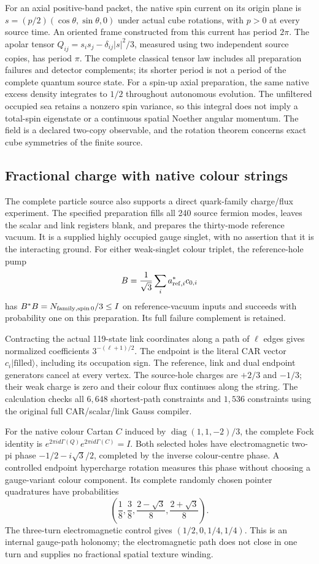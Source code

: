 For an axial positive-band packet, the native spin current on its origin
plane is $s=(p/2)(\cos\theta,\sin\theta,0)$ under actual cube rotations,
with $p>0$ at every source time. An oriented frame constructed from this
current has period $2\pi$. The apolar tensor
$Q_{ij}=s_i s_j-\delta_{ij}|s|^2/3$, measured using two independent source
copies, has period $\pi$. The complete classical tensor law includes all
preparation failures and detector complements; its shorter period is not a
period of the complete quantum source state. For a spin-up axial preparation,
the same native excess density integrates to $1/2$ throughout autonomous
evolution. The unfiltered occupied sea retains a nonzero spin variance,
so this integral does not imply a total-spin eigenstate or a continuous
spatial Noether angular momentum. The field is a declared two-copy observable,
and the rotation theorem concerns exact cube symmetries of the finite source.

\subsection{Fractional charge with native colour strings}

The complete particle source also supports a direct quark-family
charge/flux experiment. The specified preparation fills all 240 source
fermion modes, leaves the scalar and link registers blank, and prepares
the thirty-mode reference vacuum. It is a supplied highly occupied
gauge singlet, with no assertion that it is the interacting ground.
For either weak-singlet colour triplet, the reference-hole pump
\[
 B=\frac1{\sqrt3}\sum_i a_{{\rm ref},i}^*c_{0,i}
\]
has $B^*B=N_{\rm family,spin\,0}/3\leq I$ on reference-vacuum
inputs and succeeds with probability one on this preparation. Its full
failure complement is retained.

Contracting the actual 119-state link coordinates along a path of
$\ell$ edges gives normalized coefficients $3^{-(\ell+1)/2}$.
The endpoint is the literal CAR vector $c_i|\mathrm{filled}\rangle$,
including its occupation sign. The reference, link and dual endpoint
generators cancel at every vertex. The source-hole charges are
$+2/3$ and $-1/3$; their weak charge is zero and their colour flux
continues along the string. The calculation checks all $6{,}648$
shortest-path constraints and $1{,}536$ constraints using the original
full CAR/scalar/link Gauss compiler.

For the native colour Cartan $C$ induced by
$\operatorname{diag}(1,1,-2)/3$, the complete Fock identity is
$e^{2\pi i d\Gamma(Q)}e^{2\pi i d\Gamma(C)}=I$.
Both selected holes have electromagnetic two-pi phase
$-1/2-i\sqrt3/2$, completed by the inverse colour-centre phase.
A controlled endpoint hypercharge rotation measures this phase without
choosing a gauge-variant colour component. Its complete randomly chosen
pointer quadratures have probabilities
\[
 \left(\frac18,\frac38,\frac{2-\sqrt3}{8},
                         \frac{2+\sqrt3}{8}\right).
\]
The three-turn electromagnetic control gives
$(1/2,0,1/4,1/4)$. This is an internal gauge-path holonomy; the
electromagnetic path does not close in one turn and supplies no
fractional spatial texture winding.

